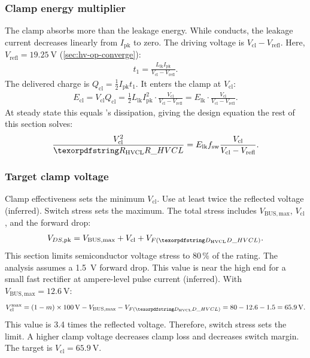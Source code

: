 \subsubsection{Clamp energy multiplier}

The clamp absorbs more than the leakage energy. While  conducts,
the leakage current decreases linearly from $I_{\mathrm{pk}}$ to zero. The
driving voltage is $V_{\mathrm{cl}}-V_{\mathrm{refl}}$. Here,
$V_{\mathrm{refl}}=\SI{19.25}{\volt}$ (\cref{sec:hv-op-converge}):
\begin{align*}
  t_1 = \frac{L_{\mathrm{lk}} I_{\mathrm{pk}}}{V_{\mathrm{cl}} - V_{\mathrm{refl}}}.
\end{align*}
The delivered charge is $Q_{\mathrm{cl}}=\tfrac{1}{2}I_{\mathrm{pk}}t_1$.
It enters the clamp at $V_{\mathrm{cl}}$:
\begin{align*}
  E_{\mathrm{cl}} = V_{\mathrm{cl}} Q_{\mathrm{cl}}
    = \tfrac{1}{2} L_{\mathrm{lk}} I_{\mathrm{pk}}^2 \cdot
      \frac{V_{\mathrm{cl}}}{V_{\mathrm{cl}} - V_{\mathrm{refl}}}
    = E_{\mathrm{lk}} \cdot
      \frac{V_{\mathrm{cl}}}{V_{\mathrm{cl}} - V_{\mathrm{refl}}}.
\end{align*}
At steady state this equals 's dissipation, giving the design
equation the rest of this section solves:
\begin{align*}
  \frac{V_{\mathrm{cl}}^2}{\des{R}{HVCL}}
    = E_{\mathrm{lk}} f_{\mathrm{sw}}
      \frac{V_{\mathrm{cl}}}{V_{\mathrm{cl}} - V_{\mathrm{refl}}}.
\end{align*}

\subsubsection{Target clamp voltage}

Clamp effectiveness sets the minimum $V_{\mathrm{cl}}$. Use at least twice the
reflected voltage (inferred). Switch stress sets the maximum. The total stress
includes $V_{\mathrm{BUS,max}}$, $V_{\mathrm{cl}}$, and the 
forward drop:
\begin{align*}
  V_{DS,\mathrm{pk}} = V_{\mathrm{BUS,max}} + V_{\mathrm{cl}} + V_{F(\des{D}{HVCL})}.
\end{align*}
This section limits semiconductor voltage stress to $80\,\%$ of the rating.
The analysis assumes a \SI{1.5}{\volt}  forward drop. This value
is near the high end for a small fast rectifier at ampere-level pulse current
(inferred). With $V_{\mathrm{BUS,max}} = \SI{12.6}{\volt}$:
\begin{align*}
  V_{\mathrm{cl}}^{\max} = (1-m)\times\SI{100}{\volt} - V_{\mathrm{BUS,max}}
    - V_{F(\des{D}{HVCL})} = 80 - 12.6 - 1.5 = \SI{65.9}{\volt}.
\end{align*}
This value is 3.4 times the reflected voltage. Therefore, switch stress sets the
limit. A higher clamp voltage decreases clamp loss and decreases switch margin.
The target is $V_{\mathrm{cl}} = \SI{65.9}{\volt}$.

